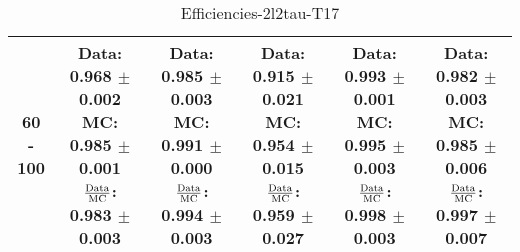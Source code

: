 \documentclass[final,letterpaper,twoside,12pt]{article}
\begin{document}
\begin{table}[htbp]
\begin{adjustwidth}{-4em}{-4em}
\begin{tabular}{|c|c|c|c|c|c|}
60 - 100 & \parbox[c]{1.1 in}{ \scriptsize  Data: 0.968 $\pm$ 0.002 \newline MC: 0.985 $\pm$ 0.001 \newline $\frac{\rm{Data}}{\rm{MC}}$: 0.983 $\pm$ 0.003} & \parbox[c]{1.1 in}{ \scriptsize  Data: 0.985 $\pm$ 0.003 \newline MC: 0.991 $\pm$ 0.000 \newline $\frac{\rm{Data}}{\rm{MC}}$: 0.994 $\pm$ 0.003} & \parbox[c]{1.1 in}{ \scriptsize  Data: 0.915 $\pm$ 0.021 \newline MC: 0.954 $\pm$ 0.015 \newline $\frac{\rm{Data}}{\rm{MC}}$: 0.959 $\pm$ 0.027} & \parbox[c]{1.1 in}{ \scriptsize  Data: 0.993 $\pm$ 0.001 \newline MC: 0.995 $\pm$ 0.003 \newline $\frac{\rm{Data}}{\rm{MC}}$: 0.998 $\pm$ 0.003} & \parbox[c]{1.1 in}{ \scriptsize  Data: 0.982 $\pm$ 0.003 \newline MC: 0.985 $\pm$ 0.006 \newline $\frac{\rm{Data}}{\rm{MC}}$: 0.997 $\pm$ 0.007}\\ \hline 
\end{tabular}
\caption {Efficiencies-2l2tau-T17}
\label{tab:cqdata0}
\end{adjustwidth}\end{table}
\end{document}
